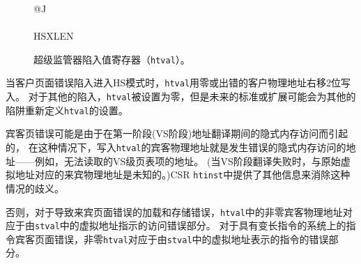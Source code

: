 \begin{figure*}[h!]
{\footnotesize
\begin{center}
\begin{tabular}{@{}J}
 \\
\hline
{} \\
\hline
HSXLEN \\
\end{tabular}
\end{center}
}
\vspace{-0.1in}
\caption{超级监管器陷入值寄存器（{\tt htval}）。
  }
\label{htvalreg}
\end{figure*}

当客户页面错误陷入进入HS模式时，{\tt htval}用零或出错的客户物理地址右移2位写入。
对于其他的陷入，{\tt htval}被设置为零，但是未来的标准或扩展可能会为其他的陷阱重新定义{\tt htval}的设置。

宾客页错误可能是由于在第一阶段(VS阶段)地址翻译期间的隐式内存访问而引起的，
在这种情况下，写入{\tt htval}的宾客物理地址就是发生错误的隐式内存访问的地址——例如，无法读取的VS级页表项的地址。
(当VS阶段翻译失败时，与原始虚拟地址对应的来宾物理地址是未知的。)CSR {\tt htinst}中提供了其他信息来消除这种情况的歧义。

否则，对于导致来宾页面错误的加载和存储错误，{\tt htval}中的非零宾客物理地址对应于由{\tt stval}中的虚拟地址指示的访问错误部分。
对于具有变长指令的系统上的指令宾客页面错误，非零{\tt htval}对应于由{\tt stval}中的虚拟地址表示的指令的错误部分。

